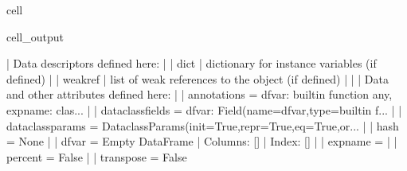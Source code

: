 \documentclass[letterpaper,10pt,english]{jupyterBook}
\begin{document}
\begin{sphinxuseclass}{cell}
\begin{sphinxVerbatimOutput}
\begin{sphinxuseclass}{cell_output}
\begin{sphinxVerbatim}[commandchars=\\\{\}]
     |  Data descriptors defined here:
     |  
     |  \PYGZus{}\PYGZus{}dict\PYGZus{}\PYGZus{}
     |      dictionary for instance variables (if defined)
     |  
     |  \PYGZus{}\PYGZus{}weakref\PYGZus{}\PYGZus{}
     |      list of weak references to the object (if defined)
     |  
     |  \PYGZhy{}\PYGZhy{}\PYGZhy{}\PYGZhy{}\PYGZhy{}\PYGZhy{}\PYGZhy{}\PYGZhy{}\PYGZhy{}\PYGZhy{}\PYGZhy{}\PYGZhy{}\PYGZhy{}\PYGZhy{}\PYGZhy{}\PYGZhy{}\PYGZhy{}\PYGZhy{}\PYGZhy{}\PYGZhy{}\PYGZhy{}\PYGZhy{}\PYGZhy{}\PYGZhy{}\PYGZhy{}\PYGZhy{}\PYGZhy{}\PYGZhy{}\PYGZhy{}\PYGZhy{}\PYGZhy{}\PYGZhy{}\PYGZhy{}\PYGZhy{}\PYGZhy{}\PYGZhy{}\PYGZhy{}\PYGZhy{}\PYGZhy{}\PYGZhy{}\PYGZhy{}\PYGZhy{}\PYGZhy{}\PYGZhy{}\PYGZhy{}\PYGZhy{}\PYGZhy{}\PYGZhy{}\PYGZhy{}\PYGZhy{}\PYGZhy{}\PYGZhy{}\PYGZhy{}\PYGZhy{}\PYGZhy{}\PYGZhy{}\PYGZhy{}\PYGZhy{}\PYGZhy{}\PYGZhy{}\PYGZhy{}\PYGZhy{}\PYGZhy{}\PYGZhy{}\PYGZhy{}\PYGZhy{}\PYGZhy{}\PYGZhy{}\PYGZhy{}\PYGZhy{}
     |  Data and other attributes defined here:
     |  
     |  \PYGZus{}\PYGZus{}annotations\PYGZus{}\PYGZus{} = \PYGZob{}\PYGZsq{}df\PYGZus{}var\PYGZsq{}: \PYGZlt{}built\PYGZhy{}in function any\PYGZgt{}, \PYGZsq{}expname\PYGZsq{}: \PYGZlt{}clas...
     |  
     |  \PYGZus{}\PYGZus{}dataclass\PYGZus{}fields\PYGZus{}\PYGZus{} = \PYGZob{}\PYGZsq{}df\PYGZus{}var\PYGZsq{}: Field(name=\PYGZsq{}df\PYGZus{}var\PYGZsq{},type=\PYGZlt{}built\PYGZhy{}in f...
     |  
     |  \PYGZus{}\PYGZus{}dataclass\PYGZus{}params\PYGZus{}\PYGZus{} = \PYGZus{}DataclassParams(init=True,repr=True,eq=True,or...
     |  
     |  \PYGZus{}\PYGZus{}hash\PYGZus{}\PYGZus{} = None
     |  
     |  df\PYGZus{}var = Empty DataFrame
     |  Columns: []
     |  Index: []
     |  
     |  expname = \PYGZsq{}\PYGZsq{}
     |  
     |  percent = False
     |  
     |  transpose = False
    

\end{sphinxVerbatim}
\end{sphinxuseclass}
\end{sphinxVerbatimOutput}
\end{sphinxuseclass}
\end{document}
